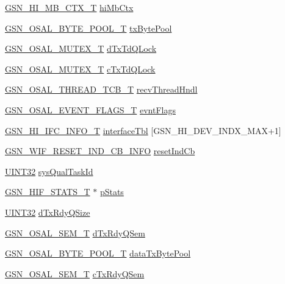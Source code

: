 \begin{DoxyCompactItemize}
\hyperlink{a00089}{GSN\_\-HI\_\-MB\_\-CTX\_\-T} \hyperlink{a00085_a8244053ac39cc74079281d9e974c512a}{hiMbCtx}
\item 
\hyperlink{a00628_gaf2af06408f9cf286dc400b5957264f00}{GSN\_\-OSAL\_\-BYTE\_\-POOL\_\-T} \hyperlink{a00085_a2ca067fff9b5c9e1fa76fefc0bce7ad5}{txBytePool}
\item 
\hyperlink{a00628_gae997291afc7166c897f459023e0154ad}{GSN\_\-OSAL\_\-MUTEX\_\-T} \hyperlink{a00085_a6743b8417044eb0c3d5f3d78f6081e43}{dTxTdQLock}
\item 
\hyperlink{a00628_gae997291afc7166c897f459023e0154ad}{GSN\_\-OSAL\_\-MUTEX\_\-T} \hyperlink{a00085_ae2d5d0c9675b0d674342c852d924a7d4}{cTxTdQLock}
\item 
\hyperlink{a00628_ga43c1eefe78fa26e478301976f96ac31f}{GSN\_\-OSAL\_\-THREAD\_\-TCB\_\-T} \hyperlink{a00085_afdaed19184edc021e1cc45d4dae26980}{recvThreadHndl}
\item 
\hyperlink{a00628_gab93fdfc637101a29260ca105d3eb924e}{GSN\_\-OSAL\_\-EVENT\_\-FLAGS\_\-T} \hyperlink{a00085_a9ad497e1b82185921e1803dca85cb36f}{evntFlags}
\item 
\hyperlink{a00086}{GSN\_\-HI\_\-IFC\_\-INFO\_\-T} \hyperlink{a00085_a5d3162115299965cb2068a915dbf22e5}{interfaceTbl} \mbox{[}GSN\_\-HI\_\-DEV\_\-INDX\_\-MAX+1\mbox{]}
\item 
\hyperlink{a00344}{GSN\_\-WIF\_\-RESET\_\-IND\_\-CB\_\-INFO} \hyperlink{a00085_a1bdc9efcf75bebaf89a89e8dc336226f}{resetIndCb}
\item 
\hyperlink{a00660_gae1e6edbbc26d6fbc71a90190d0266018}{UINT32} \hyperlink{a00085_a3d8d24efe6d7728a0e60320295f3f6c2}{sysQualTaskId}
\item 
\hyperlink{a00092}{GSN\_\-HIF\_\-STATS\_\-T} $\ast$ \hyperlink{a00085_ad4d017d4879246dcdc740c6738efede0}{pStats}
\item 
\hyperlink{a00660_gae1e6edbbc26d6fbc71a90190d0266018}{UINT32} \hyperlink{a00085_a998e0b88b8a524cea841b3da7bed4eca}{dTxRdyQSize}
\item 
\hyperlink{a00628_gab4b3554407ce22b940e2fcd3faf5fd47}{GSN\_\-OSAL\_\-SEM\_\-T} \hyperlink{a00085_a1519e565caee45b4b21956c8b900c256}{dTxRdyQSem}
\item 
\hyperlink{a00628_gaf2af06408f9cf286dc400b5957264f00}{GSN\_\-OSAL\_\-BYTE\_\-POOL\_\-T} \hyperlink{a00085_a5adb31ebca57dd3fa3941ae22fdef806}{dataTxBytePool}
\item 
\hyperlink{a00628_gab4b3554407ce22b940e2fcd3faf5fd47}{GSN\_\-OSAL\_\-SEM\_\-T} \hyperlink{a00085_a5fe078b045135031b58eb5a50a3730ee}{cTxRdyQSem}
\end{DoxyCompactItemize}


